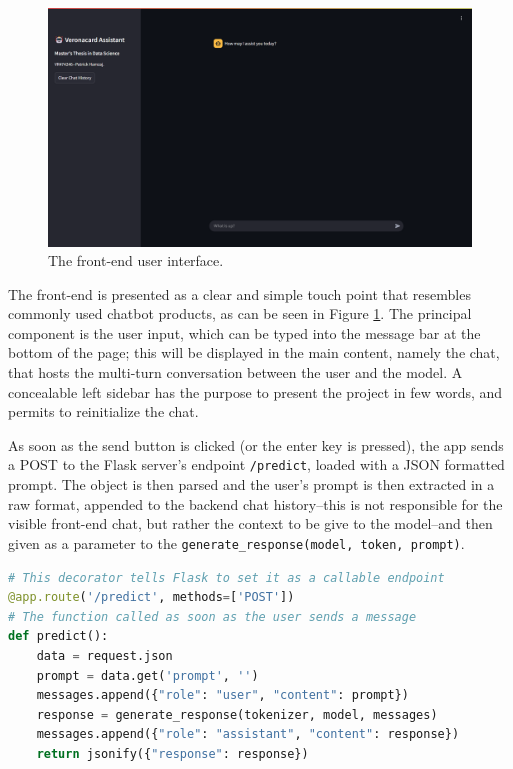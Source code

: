 \begin{figure}[h]
    \centering    
    \includegraphics[width=1\textwidth]{images/streamlit-app.png}
    \caption{The front-end user interface.}
    \label{fig:streamlit-app}
\end{figure}

The front-end is presented as a clear and simple touch point that resembles commonly used chatbot products, as can be seen in Figure \ref{fig:streamlit-app}. The principal component is the user input, which can be typed into the message bar at the bottom of the page; this will be displayed in the main content, namely the chat, that hosts the multi-turn conversation between the user and the model. A concealable left sidebar has the purpose to present the project in few words, and permits to reinitialize the chat.

As soon as the send button is clicked (or the enter key is pressed), the app sends a POST to the Flask server's endpoint \verb|/predict|, loaded with a JSON formatted prompt. The object is then parsed and the user's prompt is then extracted in a raw format, appended to the backend chat history--this is not responsible for the visible front-end chat, but rather the context to be give to the model--and then given as a parameter to the \texttt{generate\_response(model, token, prompt)}.

\begin{center}
\begin{lstlisting}[language=Python, frame=single, caption=Predict Flask API., label=lst:predict-api]
# This decorator tells Flask to set it as a callable endpoint
@app.route('/predict', methods=['POST'])
# The function called as soon as the user sends a message
def predict():
    data = request.json
    prompt = data.get('prompt', '')
    messages.append({"role": "user", "content": prompt})
    response = generate_response(tokenizer, model, messages)
    messages.append({"role": "assistant", "content": response})
    return jsonify({"response": response})
\end{lstlisting}
\end{center}

